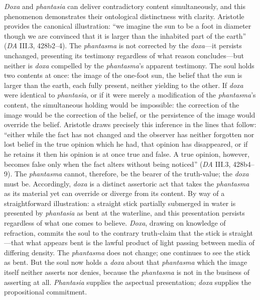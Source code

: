 \textit{Doxa} and \textit{phantasia} can deliver contradictory content simultaneously, and this phenomenon demonstrates their ontological distinctness with clarity. Aristotle provides the canonical illustration: ``we imagine the sun to be a foot in diameter though we are convinced that it is larger than the inhabited part of the earth'' (\textit{DA} III.3, 428b2--4). The \textit{phantasma} is not corrected by the \textit{doxa}---it persists unchanged, presenting its testimony regardless of what reason concludes---but neither is \textit{doxa} compelled by the \textit{phantasma}'s apparent testimony. The soul holds two contents at once: the image of the one-foot sun, the belief that the sun is larger than the earth, each fully present, neither yielding to the other. If \textit{doxa} were identical to \textit{phantasia}, or if it were merely a modification of the \textit{phantasma}'s content, the simultaneous holding would be impossible: the correction of the image would be the correction of the belief, or the persistence of the image would override the belief. Aristotle draws precisely this inference in the lines that follow: ``either while the fact has not changed and the observer has neither forgotten nor lost belief in the true opinion which he had, that opinion has disappeared, or if he retains it then his opinion is at once true and false. A true opinion, however, becomes false only when the fact alters without being noticed'' (\textit{DA} III.3, 428b4--9). The \textit{phantasma} cannot, therefore, be the bearer of the truth-value; the \textit{doxa} must be. Accordingly, \textit{doxa} is a distinct assertoric act that takes the \textit{phantasma} as its material yet can override or diverge from its content. By way of a straightforward illustration: a straight stick partially submerged in water is presented by \textit{phantasia} as bent at the waterline, and this presentation persists regardless of what one comes to believe. \textit{Doxa}, drawing on knowledge of refraction, commits the soul to the contrary truth-claim that the stick is straight---that what appears bent is the lawful product of light passing between media of differing density. The \textit{phantasma} does not change; one continues to see the stick as bent. But the soul now holds a \textit{doxa} about that \textit{phantasma} which the image itself neither asserts nor denies, because the \textit{phantasma} is not in the business of asserting at all. \textit{Phantasia} supplies the aspectual presentation; \textit{doxa} supplies the propositional commitment.

